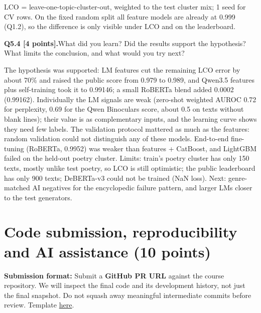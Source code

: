 \documentclass[11pt,letterpaper]{article}
\newcommand{\question}[2]{\needspace{4\baselineskip}\par\addvspace{0.45em}\noindent\textbf{#1}\quad #2\par\nobreak\vspace{0.1em}}
\newcommand{\smallnote}[1]{{\small\color{muted}#1}}
\begin{document}
\smallnote{LCO = leave-one-topic-cluster-out, weighted to the test cluster mix; 1 seed for CV rows. On the fixed random split all feature models are already at 0.999 (Q1.2), so the difference is only visible under LCO and on the leaderboard.}
\question{Q5.4 [4 points].}{What did you learn? Did the results support the hypothesis? What limits the conclusion, and what would you try next?}
The hypothesis was supported: LM features cut the remaining LCO error by about 70\% and raised the public score from 0.979 to 0.989, and Qwen3.5 features plus self-training took it to 0.99146; a small RoBERTa blend added 0.0002 (0.99162). Individually the LM signals are weak (zero-shot weighted AUROC 0.72 for perplexity, 0.69 for the Qwen Binoculars score, about 0.5 on texts without blank lines); their value is as complementary inputs, and the learning curve shows they need few labels. The validation protocol mattered as much as the features: random validation could not distinguish any of these models. End-to-end fine-tuning (RoBERTa, 0.9952) was weaker than features + CatBoost, and LightGBM failed on the held-out poetry cluster. Limits: train's poetry cluster has only 150 texts, mostly unlike test poetry, so LCO is still optimistic; the public leaderboard has only 900 texts; DeBERTa-v3 could not be trained (NaN loss). Next: genre-matched AI negatives for the encyclopedic failure pattern, and larger LMs closer to the test generators.

\section{Code submission, reproducibility and AI assistance (10 points)}
\textbf{Submission format:} Submit a \textbf{GitHub PR URL} against the course repository. We will inspect the final code and its development history, not just the final snapshot. Do not squash away meaningful intermediate commits before review. Template \href{https://github.com/sekhari/human-or-ai-submissions}{here}.
\end{document}
